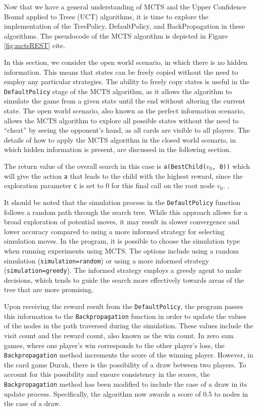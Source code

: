 Now that we have a general understanding of MCTS and the Upper Confidence Bound applied to Trees (UCT) algorithms, it is time to explore the implementation of the TreePolicy, DefaultPolicy, and BackPropagation in these algorithms. The pseudocode of the MCTS algorithm is depicted in Figure \ref{fig:mctsREST} \citep{MCTSSurvey} cite. 

In this section, we consider the open world scenario, in which there is no hidden information. This means that states can be freely copied without the need to employ any particular strategies. The ability to freely copy states is useful in the \texttt{DefaultPolicy} stage of the MCTS algorithm, as it allows the algorithm to simulate the game from a given state until the end without altering the current state. The open world scenario, also known as the perfect information scenario, allows the MCTS algorithm to explore all possible states without the need to ``cheat'' by seeing the opponent's hand, as all cards are visible to all players. The details of how to apply the MCTS algorithm in the closed world scenario, in which hidden information is present, are discussed in the following section.

The return value of the overall search in this case is \texttt{a(BestChild($v_0$, 0))} which will give the action \texttt{a} that leads to the child with the highest reward, since the exploration parameter \texttt{c} is set to 0 for this final call on the root node $v_0$. \citep{MCTSSurvey}.

It should be noted that the simulation process in the \texttt{DefaultPolicy} function follows a random path through the search tree. While this approach allows for a broad exploration of potential moves, it may result in slower convergence and lower accuracy compared to using a more informed strategy for selecting simulation moves. In the program, it is possible to choose the simulation type when running experiments using MCTS. The options include using a random simulation (\texttt{simulation=random}) or using a more informed strategy (\texttt{simulation=greedy}). The informed strategy employs a greedy agent to make decisions, which tends to guide the search more effectively towards areas of the tree that are more promising.

Upon receiving the reward result from the \texttt{DefaultPolicy}, the program passes this information to the \texttt{Backpropagation} function in order to update the values of the nodes in the path traversed during the simulation. These values include the visit count and the reward count, also known as the win count. In zero sum games, where one player's win corresponds to the other player's loss, the \texttt{Backpropagation} method increments the score of the winning player. However, in the card game Durak, there is the possibility of a draw between two players. To account for this possibility and ensure consistency in the scores, the \texttt{Backpropagation} method has been modified to include the case of a draw in its update process. Specifically, the algorithm now awards a score of 0.5 to nodes in the case of a draw.  


